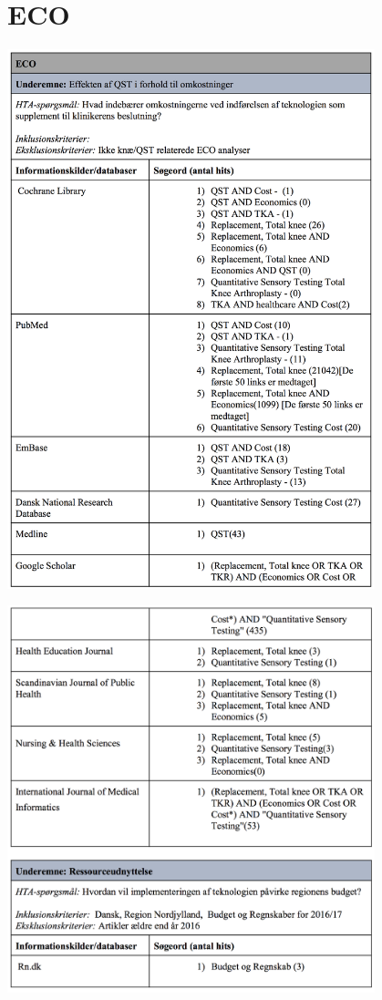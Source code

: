 \section{ECO}\label{ECO_sog}
\includegraphics[width=0.8\textwidth]{rapportAfsnit/qBilag/sogninger/ECO1}

\includegraphics[width=0.8\textwidth]{rapportAfsnit/qBilag/sogninger/ECO2}







